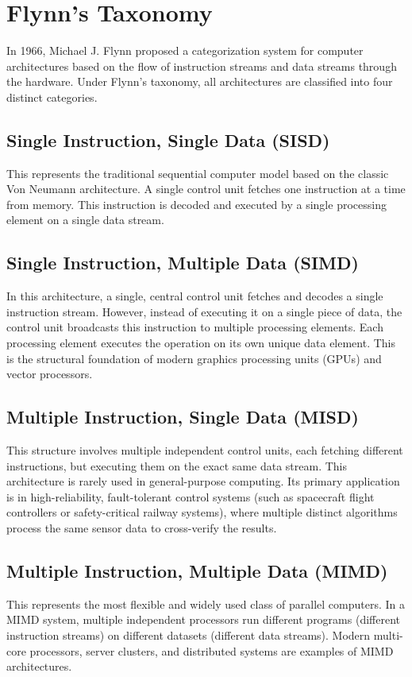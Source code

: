 \documentclass[12pt,a4paper,openany]{book}
\begin{document}
\section{Flynn's Taxonomy}
In 1966, Michael J. Flynn proposed a categorization system for computer architectures based on the flow of instruction streams and data streams through the hardware. Under Flynn's taxonomy, all architectures are classified into four distinct categories.

\subsection{Single Instruction, Single Data (SISD)}
This represents the traditional sequential computer model based on the classic Von Neumann architecture. A single control unit fetches one instruction at a time from memory. This instruction is decoded and executed by a single processing element on a single data stream.

\subsection{Single Instruction, Multiple Data (SIMD)}
In this architecture, a single, central control unit fetches and decodes a single instruction stream. However, instead of executing it on a single piece of data, the control unit broadcasts this instruction to multiple processing elements. Each processing element executes the operation on its own unique data element. This is the structural foundation of modern graphics processing units (GPUs) and vector processors.

\subsection{Multiple Instruction, Single Data (MISD)}
This structure involves multiple independent control units, each fetching different instructions, but executing them on the exact same data stream. This architecture is rarely used in general-purpose computing. Its primary application is in high-reliability, fault-tolerant control systems (such as spacecraft flight controllers or safety-critical railway systems), where multiple distinct algorithms process the same sensor data to cross-verify the results.

\subsection{Multiple Instruction, Multiple Data (MIMD)}
This represents the most flexible and widely used class of parallel computers. In a MIMD system, multiple independent processors run different programs (different instruction streams) on different datasets (different data streams). Modern multi-core processors, server clusters, and distributed systems are examples of MIMD architectures.
\end{document}
